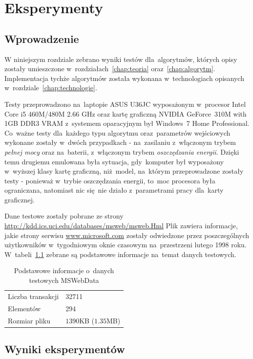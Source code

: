 \chapter{Eksperymenty\label{chap:eksperymenty}}

\section{Wprowadzenie}
W niniejszym rozdziale zebrano wyniki testów dla~algorytmów, których opisy zostały umieszczone w~rozdziałach~\ref{chap:teoria} oraz~\ref{chap:algorytm}. Implementacja tychże algorytmów została wykonana w~technologiach opisanych w~rozdziale~\ref{chap:technologie}.

Testy przeprowadzono na~laptopie ASUS U36JC wyposażonym w~procesor Intel Core i5 460M/480M 2.66 GHz oraz kartę graficzną NVIDIA GeForce~310M with 1GB DDR3 VRAM z~systemem oparacyjnym był Windows~7 Home Professional. Co~ważne testy dla~każdego typu algorytmu oraz~parametrów wejściowych wykonane zostały w~dwóch przypadkach - na~zasilaniu z~włączonym trybem \emph{pełnej mocy} oraz na~baterii, z~włączonym trybem \emph{oszczędzania energii}. Dzięki temu drugiemu emulowana była sytuacja, gdy~komputer był wyposażony w~wyższej klasy kartę graficzną, niż~model, na~którym przeprowadzone zostały testy - ponieważ w~trybie oszczędzania energii, to~moc procesora była ograniczana, natomiast nic się~nie działo z~parametrami pracy dla~karty graficznej.

Dane testowe zostały pobrane ze strony \url{http://kdd.ics.uci.edu/databases/msweb/msweb.Hml} Plik zawiera informacje, jakie strony serwisu \url{www.microsoft.com} zostały odwiedzone przez poszczególnych użytkowników w~tygodniowym oknie czasowym na~przestrzeni lutego 1998 roku. W~tabeli~\ref{msweb:desc} zebrane są podstawowe informacje na~temat danych testowych.

\begin{table}
	\centering
	\begin{tabular}{l|l}
	Liczba transakcji & 32711 \\
	Elementów & 294 \\ 
	Rozmiar pliku & $1390$KB ($1.35$MB)\\
	\end{tabular}
	\caption{Podstawowe informacje o~danych testowych MSWebData\label{msweb:desc}}
\end{table}

\section{Wyniki eksperymentów}
